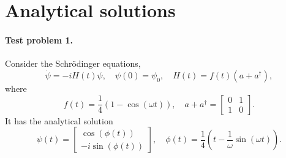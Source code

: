 \documentclass[11pt]{article}
\begin{document}



\section{Analytical solutions}
\paragraph{Test problem 1.}
Consider the Schr\"odinger equations,
\begin{equation}\label{eq_shrodinger}
\dot{\psi} = -i H(t) \psi,\quad \psi(0) = \psi_0,\quad H(t) = f(t) (a +a^\dag),
\end{equation}
where
\[
f(t) = \frac{1}{4}\left(1 - \cos(\omega t)\right),\quad a+ a^\dag
=
\begin{bmatrix}
  0 & 1\\
  1 & 0
\end{bmatrix}.
\]
It has the analytical solution
\[
\psi(t) = \begin{bmatrix}
  \cos(\phi(t))\\
  -i\sin(\phi(t))
  \end{bmatrix},\quad \phi(t) = \frac{1}{4}\left( t - \frac{1}{\omega}\sin(\omega t)\right).
\]
\end{document}
